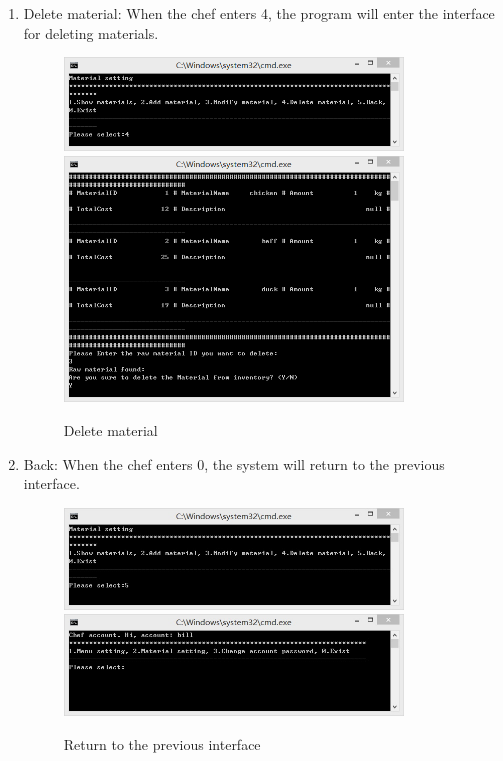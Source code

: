 \documentclass{article}
\begin{document}
\begin{enumerate}
    \item Delete material:\newline 
    When the chef enters 4, the program will enter the interface for deleting materials.
        \begin{figure}[H]
        \centering
        \includegraphics[width=0.85\textwidth]{Q/2/444441.png}
        \includegraphics[width=0.85\textwidth]{Q/2/444442.png}
        \caption{Delete material}
        \end{figure}
        
    \item Back:\newline 
    When the chef enters 0, the system will return to the previous interface.
        \begin{figure}[H]
        \centering
        \includegraphics[width=0.85\textwidth]{Q/2/Q_5a.jpg}
        \includegraphics[width=0.85\textwidth]{Q/2/Q_5b.jpg}
        \caption{Return to the previous interface}
        \end{figure}
        

\end{enumerate}
\end{document}

